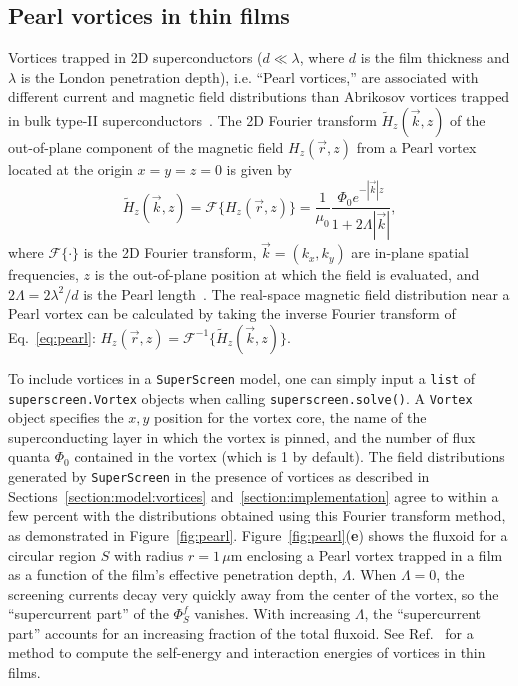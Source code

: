 \documentclass[final,3p,times,twocolumn]{elsarticle}
\newcommand{\inline}[1]{\texttt{#1}\xspace}
\newcommand{\SuperScreen}{\inline{SuperScreen}}
\newcommand{\um}{\mu\mathrm{m}}
\begin{document}
\subsection{Pearl vortices in thin films}
\label{section:examples:pearl-vortices}
Vortices trapped in 2D superconductors ($d\ll\lambda$, where $d$ is the film thickness and $\lambda$ is the London penetration depth), i.e. ``Pearl vortices,'' are associated with different current and magnetic field distributions than Abrikosov vortices trapped in bulk type-II superconductors~\cite{Pearl1964-cl}. The 2D Fourier transform $\tilde{H}_z(\vec{k}, z)$ of the out-of-plane component of the magnetic field $H_z(\vec{r}, z)$ from a Pearl vortex located at the origin $x=y=z=0$ is given by
\begin{equation}
    \tilde{H}_z(\vec{k}, z)=\mathcal{F}\{H_z(\vec{r}, z)\}=\frac{1}{\mu_0}\frac{\Phi_0e^{-|\vec{k}|z}}{1+2\Lambda|\vec{k}|},
    \label{eq:pearl}
\end{equation}
where $\mathcal{F}\{\cdot\}$ is the 2D Fourier transform, $\vec{k}=(k_x, k_y)$ are in-plane spatial frequencies, $z$ is the out-of-plane position at which the field is evaluated, and $2\Lambda = 2\lambda^2 / d$ is the Pearl length~\cite{Pearl1964-cl, Tafuri2004-ap}. The real-space magnetic field distribution near a Pearl vortex can be calculated by taking the inverse Fourier transform of Eq.~\ref{eq:pearl}: $H_z(\vec{r}, z)=\mathcal{F}^{-1}\{\tilde{H}_z(\vec{k}, z)\}$.

To include vortices in a \SuperScreen model, one can simply input a \inline{list} of \inline{superscreen.Vortex} objects when calling \inline{superscreen.solve()}. A \inline{Vortex} object specifies the $x,y$ position for the vortex core, the name of the superconducting layer in which the vortex is pinned, and the number of flux quanta $\Phi_0$ contained in the vortex (which is 1 by default). The field distributions generated by \SuperScreen in the presence of vortices as described in Sections~\ref{section:model:vortices} and~\ref{section:implementation} agree to within a few percent with the distributions obtained using this Fourier transform method, as demonstrated in Figure~\ref{fig:pearl}. Figure~\ref{fig:pearl}({\bf e}) shows the fluxoid for a circular region $S$ with radius $r=1\,\um$ enclosing a Pearl vortex trapped in a film as a function of the film's effective penetration depth, $\Lambda$. When $\Lambda=0$, the screening currents decay very quickly away from the center of the vortex, so the ``supercurrent part'' of the $\Phi^f_S$ vanishes. With increasing $\Lambda$, the ``supercurrent part'' accounts for an increasing fraction of the total fluxoid. See Ref.~\cite{Brandt2005-wj} for a method to compute the self-energy and interaction energies of vortices in thin films.
\end{document}
